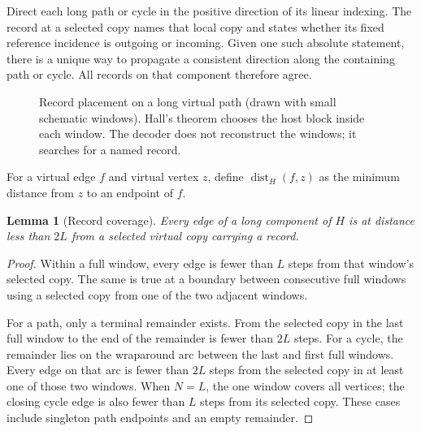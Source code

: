 \documentclass[11pt]{article}
\newtheorem{lemma}[theorem]{Lemma}
\theoremstyle{definition}
\theoremstyle{remark}
\newcommand{\dist}{\operatorname{dist}}
\begin{document}
Direct each long path or cycle in the positive direction of its linear
indexing.  The record at a selected copy names that local copy and states
whether its fixed reference incidence is outgoing or incoming.  Given one
such absolute statement, there is a unique way to propagate a consistent
direction along the containing path or cycle.  All records on that component
therefore agree.

\begin{figure}[H]
\centering
{}
\caption{Record placement on a long virtual path (drawn with small schematic
windows).  Hall's theorem chooses the host block inside each window.  The
decoder does not reconstruct the windows; it searches for a named record.}
\label{fig:windows}
\end{figure}

For a virtual edge $f$ and virtual vertex $z$, define
$\dist_H(f,z)$ as the minimum distance from $z$ to an endpoint of $f$.

\begin{lemma}[Record coverage]
\label{lem:record-coverage}
Every edge of a long component of $H$ is at distance less than $2L$ from a
selected virtual copy carrying a record.
\end{lemma}

\begin{proof}
Within a full window, every edge is fewer than $L$ steps from that window's
selected copy.  The same is true at a boundary between consecutive full
windows using a selected copy from one of the two adjacent windows.

For a path, only a terminal remainder exists.  From the selected copy in the
last full window to the end of the remainder is fewer than $2L$ steps.  For a
cycle, the remainder lies on the wraparound arc between the last and first
full windows.  Every edge on that arc is fewer than $2L$ steps from the
selected copy in at least one of those two windows.  When $N=L$, the one
window covers all vertices; the closing cycle edge is also fewer than $L$
steps from its selected copy.  These cases include singleton path endpoints
and an empty remainder.
\end{proof}
\end{document}

